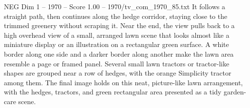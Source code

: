 \begin{textsample}{NEG Dim 1 – 1970 – Score 1.00 – 1970/tv\_com\_1970\_85.txt}
It follows a straight path, then continues along the hedge corridor, staying close to the trimmed greenery without scraping it.
Near the end, the view pulls back to a high overhead view of a small, arranged lawn scene that looks almost like a miniature display or an illustration on a rectangular green surface.
A white border along one side and a darker border along another make the lawn area resemble a page or framed panel.
Several small lawn tractors or tractor-like shapes are grouped near a row of hedges, with the orange Simplicity tractor among them.
The final image holds on this neat, picture-like lawn arrangement, with the hedges, tractors, and green rectangular area presented as a tidy garden-care scene.

\end{textsample}
